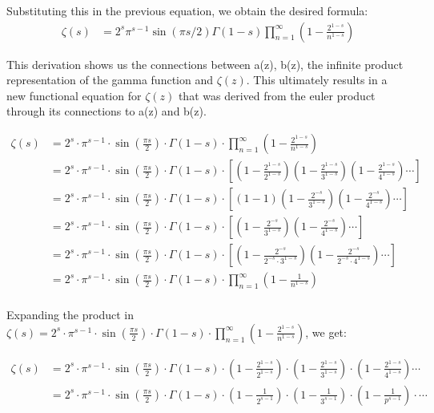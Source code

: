 \documentclass{article}
\begin{document}
Substituting this in the previous equation, we obtain the desired formula: \\

\begin{align*}
\zeta(s) &= 2^s\pi^{s-1}\sin(\pi s/2)\Gamma(1-s)\prod_{n=1}^{\infty}\left(1-\frac{2^{1-s}}{n^{1-s}}\right)
\end{align*}

This derivation shows us the connections between a(z), b(z), the infinite product representation of the gamma function and $\zeta(z)$. This ultimately results in a new functional equation for $\zeta(z)$ that was derived from the euler product through its connections to a(z) and b(z).

\begin{align*}
\zeta(s) &= 2^s \cdot \pi^{s-1} \cdot \sin(\frac{\pi s}{2}) \cdot \Gamma(1-s) \cdot \prod_{n=1}^\infty (1 - \frac{2^{1-s}}{n^{1-s}}) \\
&= 2^s \cdot \pi^{s-1} \cdot \sin(\frac{\pi s}{2}) \cdot \Gamma(1-s) \cdot \left[(1 - \frac{2^{1-s}}{2^{1-s}}) (1 - \frac{2^{1-s}}{3^{1-s}}) (1 - \frac{2^{1-s}}{4^{1-s}}) \cdots \right] \\
&= 2^s \cdot \pi^{s-1} \cdot \sin(\frac{\pi s}{2}) \cdot \Gamma(1-s) \cdot \left[(1 - 1) (1 - \frac{2^{-s}}{3^{1-s}}) (1 - \frac{2^{-s}}{4^{1-s}}) \cdots \right] \\
&= 2^s \cdot \pi^{s-1} \cdot \sin(\frac{\pi s}{2}) \cdot \Gamma(1-s) \cdot \left[(1 - \frac{2^{-s}}{3^{1-s}}) (1 - \frac{2^{-s}}{4^{1-s}}) \cdots \right] \\
&= 2^s \cdot \pi^{s-1} \cdot \sin(\frac{\pi s}{2}) \cdot \Gamma(1-s) \cdot \left[(1 - \frac{2^{-s}}{2^{-s} \cdot 3^{1-s}}) (1 - \frac{2^{-s}}{2^{-s} \cdot 4^{1-s}}) \cdots \right] \\
&= 2^s \cdot \pi^{s-1} \cdot \sin(\frac{\pi s}{2}) \cdot \Gamma(1-s) \cdot \prod_{n=1}^\infty (1 - \frac{1}{n^{1-s}}) \\
\end{align*}

Expanding the product in $\zeta(s) = 2^s \cdot \pi^{s-1} \cdot \sin(\frac{\pi s}{2}) \cdot \Gamma(1-s) \cdot \prod_{n=1}^\infty (1 - \frac{2^{1-s}}{n^{1-s}})$, we get:

\begin{align*}
\zeta(s) &= 2^s \cdot \pi^{s-1} \cdot \sin(\frac{\pi s}{2}) \cdot \Gamma(1-s) \cdot (1 - \frac{2^{1-s}}{2^{1-s}}) \cdot (1 - \frac{2^{1-s}}{3^{1-s}}) \cdot (1 - \frac{2^{1-s}}{4^{1-s}}) \cdots \\
&= 2^s \cdot \pi^{s-1} \cdot \sin(\frac{\pi s}{2}) \cdot \Gamma(1-s) \cdot (1 - \frac{1}{2^{s-1}}) \cdot (1 - \frac{1}{3^{s-1}}) \cdot (1 - \frac{1}{p^{s-1}}) \cdot \cdots
\end{align*}
\end{document}
